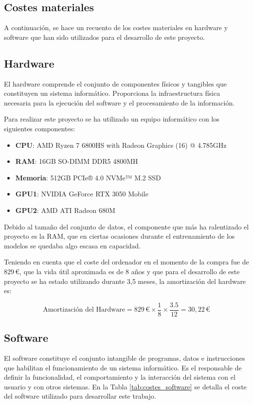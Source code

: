 \subsection{Costes materiales}
A continuación, se hace un recuento de los costes materiales en hardware y software que han sido utilizados para el desarrollo de este proyecto.
\subsection*{Hardware}
El hardware comprende el conjunto de componentes físicos y tangibles que constituyen un sistema informático. Proporciona la infraestructura física necesaria para la ejecución del software y el procesamiento de la información.

Para realizar este proyecto se ha utilizado un equipo informático con los siguientes componentes:
\begin{itemize}
\item \textbf{CPU}: AMD Ryzen 7 6800HS with Radeon Graphics (16) @ 4.785GHz
\item \textbf{RAM}: 16GB SO-DIMM DDR5 4800MH
\item \textbf{Memoria}: 512GB PCIe® 4.0 NVMe™ M.2 SSD
\item \textbf{GPU1}: NVIDIA GeForce RTX 3050 Mobile 
\item \textbf{GPU2}: AMD ATI Radeon 680M
\end{itemize}

Debido al tamaño del conjunto de datos, el componente que más ha ralentizado el proyecto es la RAM, que en ciertas ocasiones durante el entrenamiento de los modelos se quedaba algo escasa en capacidad.

Teniendo en cuenta que el coste del ordenador en el momento de la compra fue de 829\,€, que la vida útil aproximada es de 8 años y que para el desarrollo de este proyecto se ha estado utilizando durante 3,5 meses, la amortización del hardware es:

\begin{equation}
	\text{Amortización del Hardware} = 829\,\text{€} \times \frac{1}{8} \times \frac{3.5}{12} = 30,22\,\text{€}
\end{equation}

\subsection*{Software}
El software constituye el conjunto intangible de programas, datos e instrucciones que habilitan el funcionamiento de un sistema informático. Es el responsable de definir la funcionalidad, el comportamiento y la interacción del sistema con el usuario y con otros sistemas. En la Tabla \ref{tab:costes_software} se detalla el coste del software utilizado para desarrollar este trabajo.

